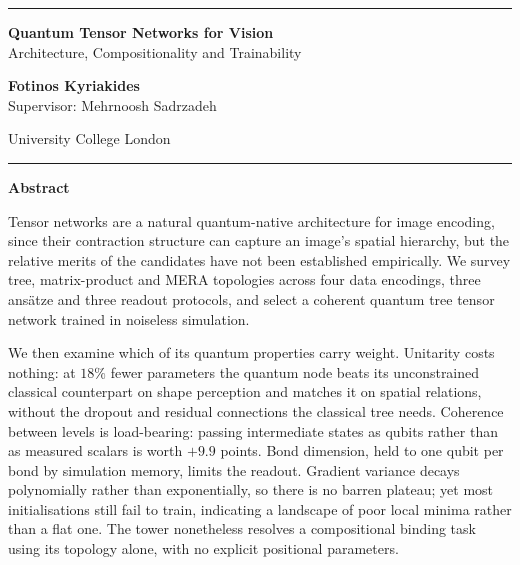 \documentclass[12pt, a4paper, oneside]{report}
\begin{document}

\begin{center}
    \vspace*{0.8cm}

    \rule{\textwidth}{0.4pt}
    \Huge \textbf{Quantum Tensor Networks for Vision} \\[0.2cm]
    \large Architecture, Compositionality and Trainability \\
    \vspace{0.8cm}

    \large \textbf{Fotinos Kyriakides} \\
    \large Supervisor: Mehrnoosh Sadrzadeh \\
    \vspace{0.2cm}


    \large University College London \\
    \rule{\textwidth}{0.4pt}

    \large \textbf{Abstract}
    \end{center}

\normalsize

Tensor networks are a natural quantum-native architecture for image encoding, since their contraction structure can capture an image's spatial hierarchy, but the relative merits of the candidates have not been established empirically. We survey tree, matrix-product and MERA topologies across four data encodings, three ans\"{a}tze and three readout protocols, and select a coherent quantum tree tensor network trained in noiseless simulation.

We then examine which of its quantum properties carry weight. Unitarity costs nothing: at $18\%$ fewer parameters the quantum node beats its unconstrained classical counterpart on shape perception and matches it on spatial relations, without the dropout and residual connections the classical tree needs. Coherence between levels is load-bearing: passing intermediate states as qubits rather than as measured scalars is worth $+9.9$ points. Bond dimension, held to one qubit per bond by simulation memory, limits the readout. Gradient variance decays polynomially rather than exponentially, so there is no barren plateau; yet most initialisations still fail to train, indicating a landscape of poor local minima rather than a flat one. The tower nonetheless resolves a compositional binding task using its topology alone, with no explicit positional parameters.
\end{document}
